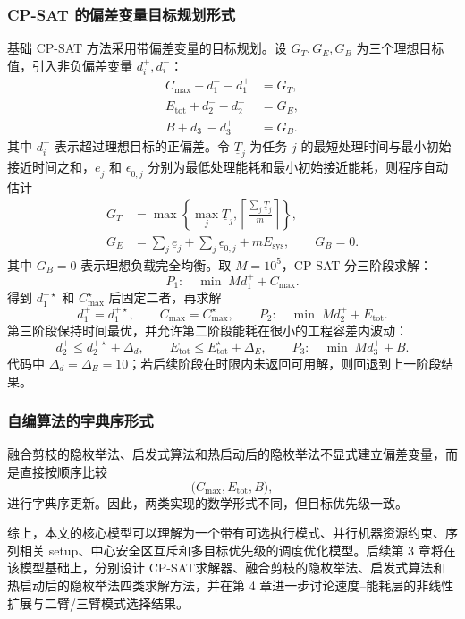 \subsubsection{CP-SAT 的偏差变量目标规划形式}

基础 CP-SAT 方法采用带偏差变量的目标规划。设 $G_T,G_E,G_B$ 为三个理想目标值，引入非负偏差变量 $d_i^+,d_i^-$：
\[
\begin{aligned}
    C_{\max}+d_1^- -d_1^+ &=G_T,\\
    E_{\mathrm{tot}}+d_2^- -d_2^+ &=G_E,\\
    B+d_3^- -d_3^+ &=G_B.
\end{aligned}
\]
其中 $d_i^+$ 表示超过理想目标的正偏差。令 $\underline{T}_j$ 为任务 $j$ 的最短处理时间与最小初始接近时间之和，$\underline e_j$ 和 $\underline\epsilon_{0,j}$ 分别为最低处理能耗和最小初始接近能耗，则程序自动估计
\[
\begin{aligned}
    G_T&=\max\left\{\max_j\underline T_j,
    \left\lceil\frac{\sum_j\underline T_j}{m}\right\rceil\right\},\\
    G_E&=\sum_j\underline e_j+\sum_j\underline\epsilon_{0,j}+mE_{\mathrm{sys}},
    \qquad G_B=0.
\end{aligned}
\]
其中 $G_B=0$ 表示理想负载完全均衡。取 $M=10^5$，CP-SAT 分三阶段求解：
\[
    P_1:\quad \min\; Md_1^+ +C_{\max}.
\]
得到 $d_1^{+\star}$ 和 $C_{\max}^{\star}$ 后固定二者，再求解
\[
    d_1^+=d_1^{+\star},\qquad
    C_{\max}=C_{\max}^{\star},
    \qquad
    P_2:\quad \min\; Md_2^+ +E_{\mathrm{tot}}.
\]
第三阶段保持时间最优，并允许第二阶段能耗在很小的工程容差内波动：
\[
    d_2^+\le d_2^{+\star}+\Delta_d,
    \qquad
    E_{\mathrm{tot}}\le E_{\mathrm{tot}}^{\star}+\Delta_E,
    \qquad
    P_3:\quad \min\; Md_3^+ +B.
\]
代码中 $\Delta_d=\Delta_E=10$；若后续阶段在时限内未返回可用解，则回退到上一阶段结果。

\subsubsection{自编算法的字典序形式}

融合剪枝的隐枚举法、启发式算法和热启动后的隐枚举法不显式建立偏差变量，而是直接按顺序比较
\[
    \bigl(C_{\max},E_{\mathrm{tot}},B\bigr),
\]
进行字典序更新。因此，两类实现的数学形式不同，但目标优先级一致。

综上，本文的核心模型可以理解为一个带有可选执行模式、并行机器资源约束、序列相关 setup、中心安全区互斥和多目标优先级的调度优化模型。后续第 3 章将在该模型基础上，分别设计 CP-SAT求解器、融合剪枝的隐枚举法、启发式算法和热启动后的隐枚举法四类求解方法，并在第 4 章进一步讨论速度--能耗层的非线性扩展与二臂/三臂模式选择结果。

